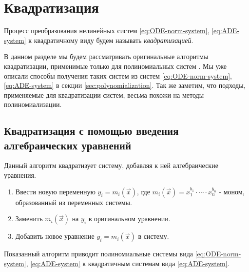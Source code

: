 
\section{Квадратизация} \label{sec:quadratiaztion}

\begin{definition}
    Процесс преобразования нелинейных систем \ref{eq:ODE-norm-system}, \ref{eq:ADE-system} к квадратичному виду будем называть \textit{квадратизацией}.
\end{definition}

В данном разделе мы будем рассматривать оригинальные алгоритмы квадратизации, применимые только для  полиномиальных систем \cite{Gu-PhD}. Мы уже описали способы получения таких систем из систем \ref{eq:ODE-norm-system}, \ref{eq:ADE-system} в секции \ref{sec:polynomialization}. Так же заметим, что подходы, применяемые для квадратизации систем, весьма похожи на методы полиномиализации.

\subsection{Квадратизация с помощью введения алгебраических уравнений} \label{sec:quad-algebraic}

Данный алгоритм квадратизует систему, добавляя к ней алгебраические уравнения.

\begin{enumerate}
    \item Ввести новую переменную $y_i = m_i(\vec x)$, где $m_i(\vec x) = x_1^{b_1}\cdot \cdots \cdot x_n^{b_n}$ - моном, образованный из переменных системы.
    \item Заменить $m_i(\vec x)$ на $y_i$ в оригинальном уравнении.
    \item Добавить новое уравнение $y_i = m_i(\vec x)$ в систему.
\end{enumerate}

Показанный алгоритм приводит полиномиальные системы вида \eqref{eq:ODE-norm-system}, \eqref{eq:ADE-system} к квадратичным системам вида \eqref{eq:ADE-system}.

